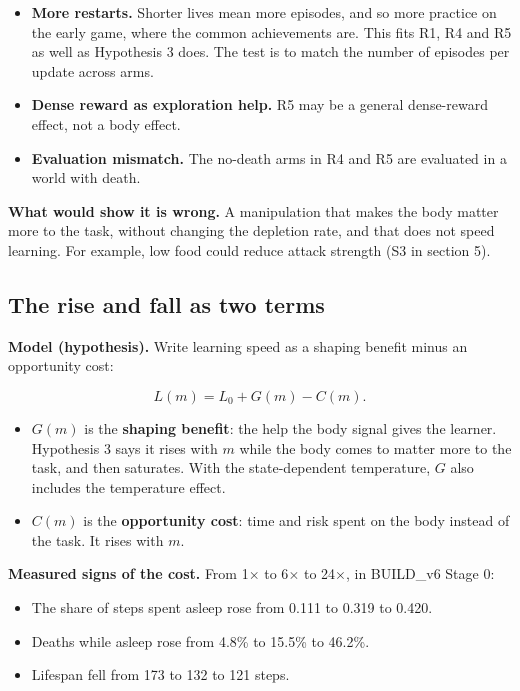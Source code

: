 \documentclass[11pt]{article}
\begin{document}
\begin{itemize}
\item \textbf{More restarts.} Shorter lives mean more episodes, and so more practice on the early game, where the common achievements are. This fits R1, R4 and R5 as well as Hypothesis 3 does. The test is to match the number of episodes per update across arms.
\item \textbf{Dense reward as exploration help.} R5 may be a general dense-reward effect, not a body effect.
\item \textbf{Evaluation mismatch.} The no-death arms in R4 and R5 are evaluated in a world with death.
\end{itemize}

\textbf{What would show it is wrong.} A manipulation that makes the body matter more to the task, without changing the depletion rate, and that does not speed learning. For example, low food could reduce attack strength (S3 in section 5).

\subsection{The rise and fall as two terms}

\textbf{Model (hypothesis).} Write learning speed as a shaping benefit minus an opportunity cost:

\[
L(m) = L_0 + G(m) - C(m).
\]

\begin{itemize}
\item $G(m)$ is the \textbf{shaping benefit}: the help the body signal gives the learner. Hypothesis 3 says it rises with $m$ while the body comes to matter more to the task, and then saturates. With the state-dependent temperature, $G$ also includes the temperature effect.
\item $C(m)$ is the \textbf{opportunity cost}: time and risk spent on the body instead of the task. It rises with $m$.
\end{itemize}

\textbf{Measured signs of the cost.} From 1$\times$ to 6$\times$ to 24$\times$, in BUILD\_v6 Stage 0:

\begin{itemize}
\item The share of steps spent asleep rose from 0.111 to 0.319 to 0.420.
\item Deaths while asleep rose from 4.8\% to 15.5\% to 46.2\%.
\item Lifespan fell from 173 to 132 to 121 steps.
\end{itemize}
\end{document}

